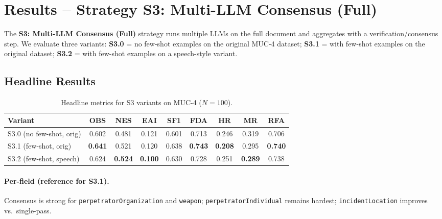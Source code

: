 \section{Results – Strategy S3: Multi-LLM Consensus (Full)}
\label{sec:eval-s3}

The \textbf{S3: Multi-LLM Consensus (Full)} strategy runs multiple LLMs on the full document and aggregates with a verification/consensus step.
We evaluate three variants:
\textbf{S3.0} = no few-shot examples on the original MUC-4 dataset;
\textbf{S3.1} = with few-shot examples on the original dataset;
\textbf{S3.2} = with few-shot examples on a speech-style variant.

\subsection*{Headline Results}

\begin{table}[H]
    \centering
    \caption{Headline metrics for S3 variants on MUC-4 ($N{=}100$).}
    \label{tab:s3-variants-headline}
    \begin{tabular}{lcccccccc}
        \toprule
        Variant & OBS & NES & EAI & SF1 & FDA & HR & MR & RFA \\
        \midrule
        S3.0 (no few-shot, orig) & 0.602 & 0.481 & 0.121 & 0.601 & 0.713 & 0.246 & 0.319 & 0.706 \\
        S3.1 (few-shot, orig)    & \textbf{0.641} & 0.521 & 0.120 & 0.638 & \textbf{0.743} & \textbf{0.208} & 0.295 & \textbf{0.740} \\
        S3.2 (few-shot, speech)  & 0.624 & \textbf{0.524} & \textbf{0.100} & 0.630 & 0.728 & 0.251 & \textbf{0.289} & 0.738 \\
        \bottomrule
    \end{tabular}
\end{table}

\paragraph{Per-field (reference for S3.1).}
Consensus is strong for \texttt{perpetratorOrganization} and \texttt{weapon}; \texttt{perpetratorIndividual} remains hardest; \texttt{incidentLocation} improves vs.\ single-pass.

